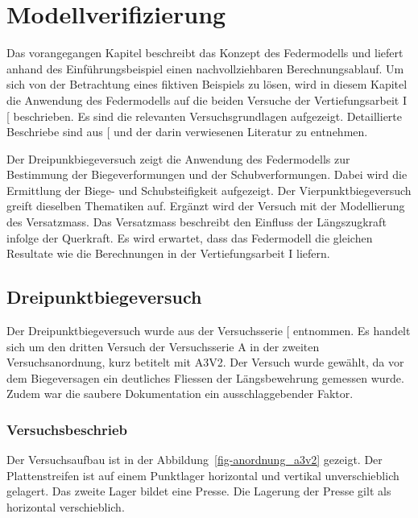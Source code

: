 \documentclass[
  11pt,
  letterpaper,
]{scrreprt}
\begin{document}

\chapter{Modellverifizierung}\label{sec-verifizierung}

Das vorangegangen Kapitel beschreibt das Konzept des Federmodells und
liefert anhand des Einführungsbeispiel einen nachvollziehbaren
Berechnungsablauf. Um sich von der Betrachtung eines fiktiven Beispiels
zu lösen, wird in diesem Kapitel die Anwendung des Federmodells auf die
beiden Versuche der Vertiefungsarbeit I
{[}\citeproc{ref-gitz_ansatze_2024}{1}{]} beschrieben. Es sind die
relevanten Versuchsgrundlagen aufgezeigt. Detaillierte Beschriebe sind
aus {[}\citeproc{ref-gitz_ansatze_2024}{1}{]} und der darin verwiesenen
Literatur zu entnehmen.

Der Dreipunkbiegeversuch zeigt die Anwendung des Federmodells zur
Bestimmung der Biegeverformungen und der Schubverformungen. Dabei wird
die Ermittlung der Biege- und Schubsteifigkeit aufgezeigt. Der
Vierpunktbiegeversuch greift dieselben Thematiken auf. Ergänzt wird der
Versuch mit der Modellierung des Versatzmass. Das Versatzmass beschreibt
den Einfluss der Längszugkraft infolge der Querkraft. Es wird erwartet,
dass das Federmodell die gleichen Resultate wie die Berechnungen in der
Vertiefungsarbeit I liefern.

\section{Dreipunktbiegeversuch}\label{dreipunktbiegeversuch}

Der Dreipunktbiegeversuch wurde aus der Versuchsserie
{[}\citeproc{ref-jager_versuche_2006}{2}{]} entnommen. Es handelt sich
um den dritten Versuch der Versuchsserie A in der zweiten
Versuchsanordnung, kurz betitelt mit A3V2. Der Versuch wurde gewählt, da
vor dem Biegeversagen ein deutliches Fliessen der Längsbewehrung
gemessen wurde. Zudem war die saubere Dokumentation ein
ausschlaggebender Faktor.

\subsection{Versuchsbeschrieb}\label{versuchsbeschrieb}

Der Versuchsaufbau ist in der Abbildung~\ref{fig-anordnung_a3v2}
gezeigt. Der Plattenstreifen ist auf einem Punktlager horizontal und
vertikal unverschieblich gelagert. Das zweite Lager bildet eine Presse.
Die Lagerung der Presse gilt als horizontal verschieblich.
\end{document}
